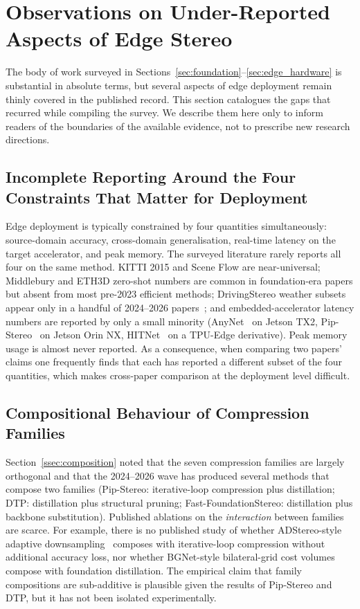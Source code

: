 \section{Observations on Under-Reported Aspects of Edge Stereo}
\label{sec:roadmap}

The body of work surveyed in Sections~\ref{sec:foundation}--\ref{sec:edge_hardware} is substantial in absolute terms, but several aspects of edge deployment remain thinly covered in the published record. This section catalogues the gaps that recurred while compiling the survey. We describe them here only to inform readers of the boundaries of the available evidence, not to prescribe new research directions.

\subsection{Incomplete Reporting Around the Four Constraints That Matter for Deployment}

Edge deployment is typically constrained by four quantities simultaneously: source-domain accuracy, cross-domain generalisation, real-time latency on the target accelerator, and peak memory. The surveyed literature rarely reports all four on the same method. KITTI 2015 and Scene Flow are near-universal; Middlebury and ETH3D zero-shot numbers are common in foundation-era papers but absent from most pre-2023 efficient methods; DrivingStereo weather subsets appear only in a handful of 2024--2026 papers~\cite{zheng2026pipstereo,jing2025liteanystereo}; and embedded-accelerator latency numbers are reported by only a small minority (AnyNet~\cite{wang2019anynet} on Jetson TX2, Pip-Stereo~\cite{zheng2026pipstereo} on Jetson Orin NX, HITNet~\cite{tankovich2021hitnet} on a TPU-Edge derivative). Peak memory usage is almost never reported. As a consequence, when comparing two papers' claims one frequently finds that each has reported a different subset of the four quantities, which makes cross-paper comparison at the deployment level difficult.

\subsection{Compositional Behaviour of Compression Families}

Section~\ref{ssec:composition} noted that the seven compression families are largely orthogonal and that the 2024--2026 wave has produced several methods that compose two families (Pip-Stereo: iterative-loop compression plus distillation; DTP: distillation plus structural pruning; Fast-FoundationStereo: distillation plus backbone substitution). Published ablations on the \emph{interaction} between families are scarce. For example, there is no published study of whether ADStereo-style adaptive downsampling~\cite{wang2023adstereo} composes with iterative-loop compression without additional accuracy loss, nor whether BGNet-style bilateral-grid cost volumes~\cite{xu2021bgnet} compose with foundation distillation. The empirical claim that family compositions are sub-additive is plausible given the results of Pip-Stereo and DTP, but it has not been isolated experimentally.

